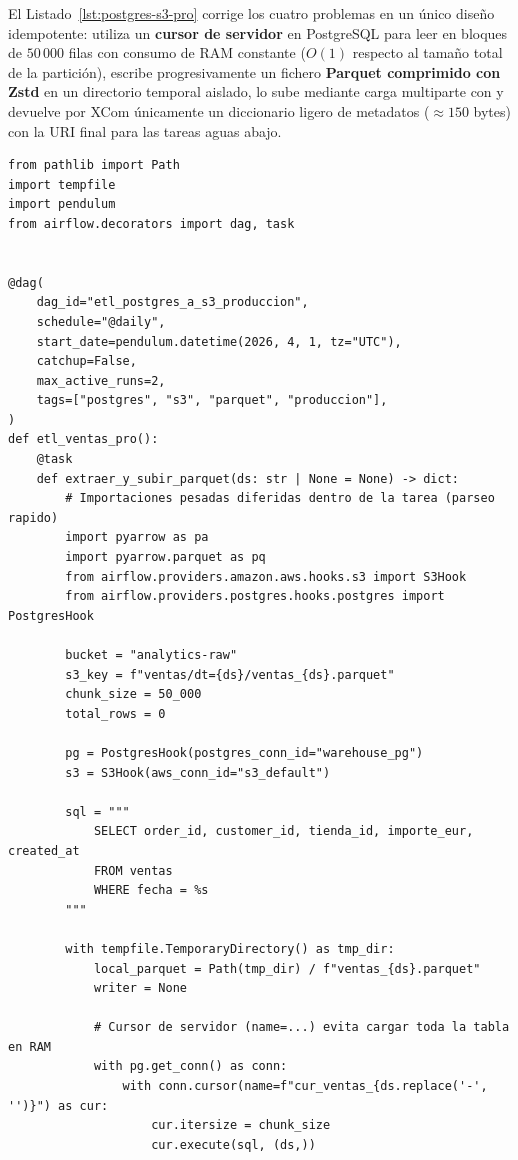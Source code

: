 \begin{examplebox}
El Listado~\ref{lst:postgres-s3-pro} corrige los cuatro problemas en un único diseño idempotente: utiliza un \textbf{cursor de servidor} en PostgreSQL para leer en bloques de $50\,000$ filas con consumo de RAM constante ($O(1)$ respecto al tamaño total de la partición), escribe progresivamente un fichero \textbf{Parquet comprimido con Zstd} en un directorio temporal aislado, lo sube mediante carga multiparte con  y devuelve por XCom únicamente un diccionario ligero de metadatos ($\approx 150$ bytes) con la URI final para las tareas aguas abajo.

\begin{lstlisting}[style=python, caption={Versión de producción: extracción por cursor en streaming, escritura incremental en Parquet y paso exclusivo de URI por XCom.}, label={lst:postgres-s3-pro}]
from pathlib import Path
import tempfile
import pendulum
from airflow.decorators import dag, task


@dag(
    dag_id="etl_postgres_a_s3_produccion",
    schedule="@daily",
    start_date=pendulum.datetime(2026, 4, 1, tz="UTC"),
    catchup=False,
    max_active_runs=2,
    tags=["postgres", "s3", "parquet", "produccion"],
)
def etl_ventas_pro():
    @task
    def extraer_y_subir_parquet(ds: str | None = None) -> dict:
        # Importaciones pesadas diferidas dentro de la tarea (parseo rapido)
        import pyarrow as pa
        import pyarrow.parquet as pq
        from airflow.providers.amazon.aws.hooks.s3 import S3Hook
        from airflow.providers.postgres.hooks.postgres import PostgresHook

        bucket = "analytics-raw"
        s3_key = f"ventas/dt={ds}/ventas_{ds}.parquet"
        chunk_size = 50_000
        total_rows = 0

        pg = PostgresHook(postgres_conn_id="warehouse_pg")
        s3 = S3Hook(aws_conn_id="s3_default")

        sql = """
            SELECT order_id, customer_id, tienda_id, importe_eur, created_at
            FROM ventas
            WHERE fecha = %s
        """

        with tempfile.TemporaryDirectory() as tmp_dir:
            local_parquet = Path(tmp_dir) / f"ventas_{ds}.parquet"
            writer = None

            # Cursor de servidor (name=...) evita cargar toda la tabla en RAM
            with pg.get_conn() as conn:
                with conn.cursor(name=f"cur_ventas_{ds.replace('-', '')}") as cur:
                    cur.itersize = chunk_size
                    cur.execute(sql, (ds,))


\end{lstlisting}
\end{examplebox}
